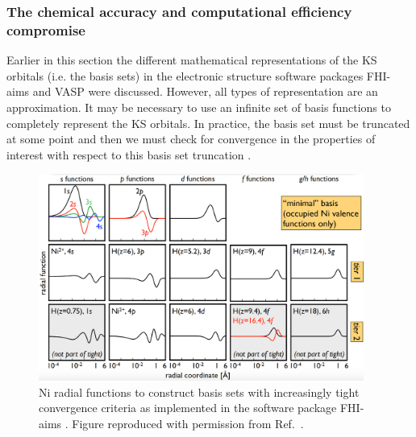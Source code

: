 \documentclass[11pt, twoside]{report}
\begin{document}
\subsubsection{The chemical accuracy and computational efficiency compromise}\label{chem_acc_vs_eff}
Earlier in this section the different mathematical representations of the KS orbitals (i.e. the basis sets) in the electronic structure software packages FHI-aims and VASP were discussed. However, all types of representation are an approximation. It may be necessary to use an infinite set of basis functions to completely represent the KS orbitals. In practice, the basis set must be truncated at some point and then we must check for convergence in the properties of interest with respect to this basis set truncation \cite{Prasad_ch6}. 

\begin{figure}[h!]
  \centering
    \includegraphics[width=0.95\textwidth]{figures/FHI-aims_tiers.png}
    \caption[Ni radial functions to construct basis sets with increasingly tight convergence criteria as implemented in the software package FHI-aims.]{Ni radial functions to construct basis sets with increasingly tight convergence criteria as implemented in the software package FHI-aims \cite{FHI-aims}. Figure reproduced with permission from Ref.~.}
  \label{FHI-aims_tiers}
\end{figure}
\end{document}
